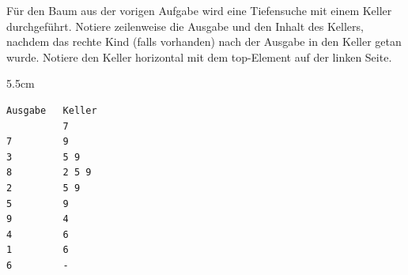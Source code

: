 \question[4]
Für den Baum aus der vorigen Aufgabe wird eine Tiefensuche mit einem Keller durchgeführt. Notiere zeilenweise die Ausgabe und den Inhalt des Kellers,
nachdem das rechte Kind (falls vorhanden) nach der Ausgabe in den Keller getan wurde. Notiere den Keller horizontal mit dem top-Element auf der linken Seite.
\begin{solutionbox}{5.5cm}
\begin{lstlisting}[language={}]
Ausgabe   Keller
          7
7         9
3         5 9
8         2 5 9
2         5 9
5         9
9         4
4         6
1         6
6         -
\end{lstlisting}
\end{solutionbox}
